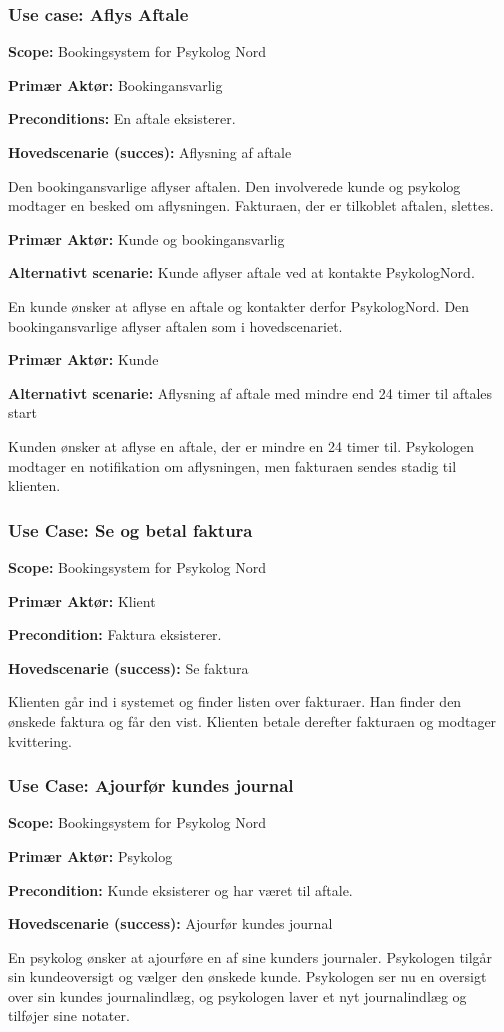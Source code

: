 \subsubsection*{Use case: Aflys Aftale}
{\setlength{\parindent}{0cm}
\textbf{Scope:} Bookingsystem for Psykolog Nord

\textbf{Primær Aktør:} Bookingansvarlig

\textbf{Preconditions:} En aftale eksisterer.

\textbf{Hovedscenarie (succes):} Aflysning af aftale

Den bookingansvarlige aflyser aftalen.
Den involverede kunde og psykolog modtager en besked om aflysningen. Fakturaen, der er tilkoblet aftalen, slettes.

\textbf{Primær Aktør:} Kunde og bookingansvarlig

\textbf{Alternativt scenarie:} Kunde aflyser aftale ved at kontakte PsykologNord.

En kunde ønsker at aflyse en aftale og kontakter derfor PsykologNord.
Den bookingansvarlige aflyser aftalen som i hovedscenariet.

\textbf{Primær Aktør:} Kunde

\textbf{Alternativt scenarie:} Aflysning af aftale med mindre end 24 timer til aftales start

Kunden ønsker at aflyse en aftale, der er mindre en 24 timer til.
Psykologen modtager en notifikation om aflysningen, men fakturaen sendes stadig til klienten.
}

\subsubsection*{Use Case: Se og betal faktura}
{\setlength{\parindent}{0cm}
\textbf{Scope:} Bookingsystem for Psykolog Nord

\textbf{Primær Aktør:} Klient

\textbf{Precondition:} Faktura eksisterer.

\textbf{Hovedscenarie (success):} Se faktura

Klienten går ind i systemet og finder listen over fakturaer. 
Han finder den ønskede faktura og får den vist. Klienten betale derefter fakturaen og modtager kvittering.
}

\subsubsection*{Use Case: Ajourfør kundes journal}
{\setlength{\parindent}{0cm}
\textbf{Scope:} Bookingsystem for Psykolog Nord

\textbf{Primær Aktør:} Psykolog

\textbf{Precondition:} Kunde eksisterer og har været til aftale.

\textbf{Hovedscenarie (success):} Ajourfør kundes journal

En psykolog ønsker at ajourføre en af sine kunders journaler.
Psykologen tilgår sin kundeoversigt og vælger den ønskede kunde.
Psykologen ser nu en oversigt over sin kundes journalindlæg, og psykologen laver et nyt journalindlæg og tilføjer sine notater.
}


